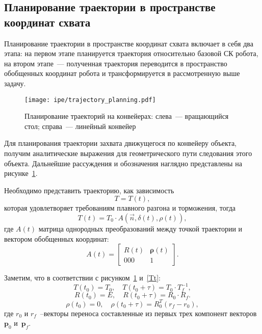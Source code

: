 \vspace{0.5cm}
\subsection{Планирование траектории в пространстве координат схвата}

Планирование траектории в пространстве координат схвата включает в себя два этапа: на первом этапе планируется траектория относительно базовой СК робота, на втором этапе~--- полученная траектория переводится в пространство обобщенных координат робота и трансформируется в рассмотренную выше задачу.

\begin{figure}[h!]
	\centering\texttt{[image: ipe/trajectory\_planning.pdf]}
	\vspace{0.5cm}
	\caption{Планирование траекторий на конвейерах: слева~--- вращающийся стол; справа~--- линейный конвейер}
	\label{img:trajectory_planning}
\end{figure}

Для планирования траектории захвата движущегося по конвейеру объекта, получим аналитические выражения для геометрического пути следования этого объекта. 
Дальнейшие рассуждения и обозначения наглядно представлены на рисунке~\ref{img:trajectory_planning}.

Необходимо представить траекторию, как зависимость
\begin{equation}
	T = T(t),
\end{equation}
которая удовлетворяет требованиям плавного разгона и торможения, тогда
\begin{equation}\label{Tt}
	T(t) = T_0 \cdot A(\overrightarrow{n}, \delta(t), \rho(t)),
\end{equation}
где $ A(t) $ матрица однородных преобразований между точкой траектории и вектором обобщенных координат:
\begin{equation}
	A(t) = 
	\begin{bmatrix}
	R(t) & \mathbf{\rho}(t)\\
	000&1
	\end{bmatrix}\!.
\end{equation}

Заметим, что в соответствии с рисунком~\ref{img:trajectory_planning} и~\eqref{Tt}:
\begin{equation}
	T(t_0) =T_0, \quad T(t_0 + \tau) = T_0 \cdot T_f^{-1},
\end{equation}
\begin{equation}
	R(t_0) = E, \quad R(t_0+\tau) = R_0 \cdot R_f.
\end{equation}
\begin{equation}
	\rho(t_0) = 0, \quad \rho(t_0 + \tau) = R^T_0 (r_f - r_0),
\end{equation}
где $ r_0 $ и $ r_f $~--векторы переноса составленные из первых трех компонент векторов~$ \mathbf{p}_0 $ и~$ \mathbf{p}_f $.


